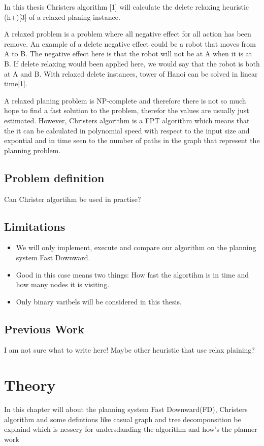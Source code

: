\documentclass[cropmarks, frame, english]{idamasterthesis}
\begin{document}
In this thesis Christers algorithm [1] will calculate the delete relaxing heuristic (h+)[3] of a relaxed planing instance. 

A relaxed problem is a problem where all negative effect for all action has been remove. An example of a delete negative effect could be a robot that moves from A to B. The negative effect here is that the robot will not be at A when it is at B. If delete relaxing would been applied here, we would say that the robot is both at A and B.
 With relaxed delete instances, tower of Hanoi can be solved in linear time[1].

A relaxed planing problem is NP-complete and therefore there is not so much hope to find a fast solution to the problem,  therefor the values are usually just estimated. However, Christers algorithm is a FPT algorithm which means that the it can be calculated in polynomial speed with respect to the input size and expontial and in time seen to the number of paths in the graph that represent the planning problem.



\section{Problem definition}
Can Christer algortihm be used in practise?
\section{Limitations}

\begin{itemize}
   \item{We will only implement, execute and compare our algorithm on the planning system Fast Downward.}
   \item{Good in this case means two things: How fast the algortihm is in time and how many nodes it is visiting.}
   \item{Only binary varibels will be considered in this thesis.}
\end{itemize}

\section{Previous Work}
I am not sure what to write here! Maybe other heuristic that use relax plaining?

\chapter{Theory}
In this chapter will about the planning system Fast Downward(FD), Christers algorithm and some defintions like casual graph and tree decomponsition be explaind which is nessery for undersdanding the algorithm and how's the planner work
\end{document}
